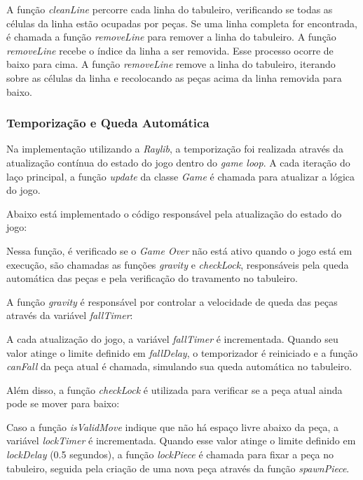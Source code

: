 

A função \textit{cleanLine} percorre cada linha do tabuleiro, verificando se todas as células da linha estão ocupadas por peças. Se uma linha completa for encontrada, é chamada a função \textit{removeLine} para remover a linha do tabuleiro. A função \textit{removeLine} recebe o índice da linha a ser removida. Esse processo ocorre de baixo para cima. A função \textit{removeLine} remove a linha do tabuleiro, iterando sobre as células da linha e recolocando as peças acima da linha removida para baixo.


\subsubsection{Temporização e Queda Automática}

Na implementação utilizando a \textit{Raylib}, a temporização foi realizada através da atualização contínua do estado do jogo dentro do \textit{game loop}. A cada iteração do laço principal, a função \textit{update} da classe \textit{Game} é chamada para atualizar a lógica do jogo.

Abaixo está implementado o código responsável pela atualização do estado do jogo:



Nessa função, é verificado se o \textit{Game Over} não está ativo quando o jogo está em execução, são chamadas as funções \textit{gravity} e \textit{checkLock}, responsáveis pela queda automática das peças e pela verificação do travamento no tabuleiro.

A função \textit{gravity} é responsável por controlar a velocidade de queda das peças através da variável \textit{fallTimer}:



A cada atualização do jogo, a variável \textit{fallTimer} é incrementada. Quando seu valor atinge o limite definido em \textit{fallDelay}, o temporizador é reiniciado e a função \textit{canFall} da peça atual é chamada, simulando sua queda automática no tabuleiro.

Além disso, a função \textit{checkLock} é utilizada para verificar se a peça atual ainda pode se mover para baixo:



Caso a função \textit{isValidMove} indique que não há espaço livre abaixo da peça, a variável \textit{lockTimer} é incrementada. Quando esse valor atinge o limite definido em \textit{lockDelay} (0.5 segundos), a função \textit{lockPiece} é chamada para fixar a peça no tabuleiro, seguida pela criação de uma nova peça através da função \textit{spawnPiece}.

